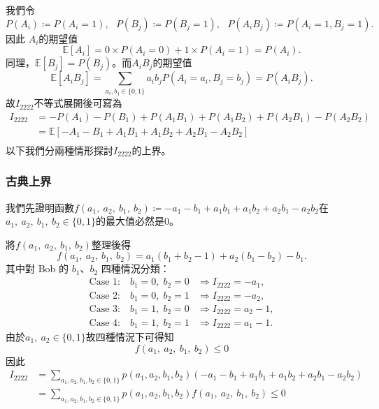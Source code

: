 \documentclass[12pt, a4paper, twoside, reqno]{article}
\begin{document}
\noindent 我們令
\[
    P(A_i) \coloneq P(A_i=1),~~~P(B_j) \coloneq P(B_j=1),~~~P(A_iB_j) \coloneq P(A_i=1,B_j=1).
\]
因此 $A_i$的期望值
\[
    \mathbb{E}[A_i] = 0\times P(A_i=0) + 1\times P(A_i=1) = P(A_i).
\]
同理，$\mathbb{E}[B_j] = P(B_j)$。而$A_iB_j$的期望值
\[
    \mathbb{E}[A_iB_j] = \sum_{{a_i},{b_j}\in\{0,1\}}a_ib_jP(A_i=a_i,B_j=b_j) = P(A_iB_j).
\]
故$I_{2222}$不等式展開後可寫為
\begin{equation}
    \begin{aligned}
        I_{2222}
        &=-P(A_1)-P(B_1)+P(A_1B_1)+P(A_1B_2)+P(A_2B_1)-P(A_2B_2)\\
        &=\mathbb{E}[-A_1-B_1+A_1B_1+A_1B_2+A_2B_1-A_2B_2]\\
    \end{aligned}
\end{equation}
以下我們分兩種情形探討$I_{2222}$的上界。

\subsubsection{古典上界}
我們先證明函數$f(a_1,~a_2,~b_1,~b_2)\coloneq - a_1 - b_1 + a_1b_1 + a_1b_2 + a_2b_1 - a_2b_2$在$a_1,~a_2,~b_1,~b_2 \in \{0,1\}$的最大值必然是0。

\noindent 將$f(a_1,~a_2,~b_1,~b_2)$整理後得
\[
    f(a_1,~a_2,~b_1,~b_2) = a_1(b_1 + b_2 - 1) + a_2(b_1 - b_2) - b_1.
\]
\noindent 其中對 Bob 的 $b_1$、$b_2$ 四種情況分類：
\[
    \begin{aligned}
        \text{Case 1:}\quad
        b_1=0,\;b_2=0
        &\Longrightarrow
        I_{2222}=-a_1,\\[4pt]
        \text{Case 2:}\quad
        b_1=0,\;b_2=1
        &\Longrightarrow
        I_{2222}=-a_2,\\[4pt]
        \text{Case 3:}\quad
        b_1=1,\;b_2=0
        &\Longrightarrow
        I_{2222}=a_2-1,\\[4pt]
        \text{Case 4:}\quad
        b_1=1,\;b_2=1
        &\Longrightarrow
        I_{2222}=a_1-1.
    \end{aligned}
\]
由於$a_1,~a_2 \in \{0,1\}$故四種情況下可得知
\[
    f(a_1,~a_2,~b_1,~b_2)\leq 0
    \label{I2222-classical-maxvalue}
\]
因此
\begin{equation}
    \begin{aligned}
        I_{2222} 
        &= \sum_{a_1,a_2,b_1,b_2 \in\{0,1\}} p(a_1,a_2,b_1,b_2)(- a_1 - b_1 + a_1b_1 + a_1b_2 + a_2b_1 - a_2b_2)\\
        &= \sum_{a_1,a_2,b_1,b_2 \in\{0,1\}} p(a_1,a_2,b_1,b_2)f(a_1,~a_2,~b_1,~b_2)\leq 0
    \end{aligned}
\end{equation}
\end{document}
